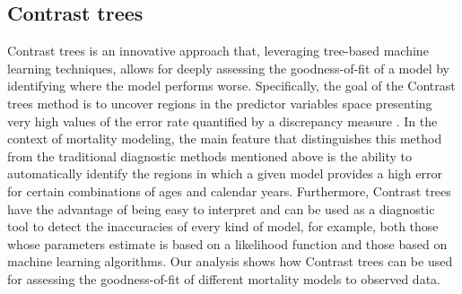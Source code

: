 \documentclass[fleqn,10pt]{wlscirep}
\begin{document}
\subsection*{Contrast trees}
\color{blue}Contrast trees is an innovative approach that, leveraging tree-based machine learning techniques, allows for deeply assessing the goodness-of-fit of a model by identifying where the model performs worse. \color{black}
Specifically, the goal of the Contrast trees method is to uncover regions in the predictor variables space presenting very high values of the error rate quantified by a discrepancy measure \cite{Friedman2020}. \color{blue}In the context of mortality modeling, the main feature that distinguishes this method from the traditional diagnostic methods mentioned above is the ability to automatically identify the regions in which a given model provides a high error for certain combinations of ages and calendar years.
Furthermore, Contrast trees have the advantage of being easy to interpret and can be used as a diagnostic tool to detect the inaccuracies of every kind of model, for example, both those whose parameters estimate is based on a likelihood function and those based on machine learning algorithms. Our analysis shows how Contrast trees can be used for assessing the goodness-of-fit of different mortality models to observed data. 
\color{black}
\end{document}
